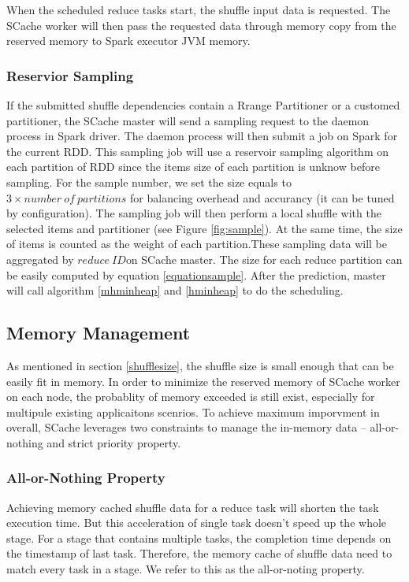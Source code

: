 When the scheduled reduce tasks start, the shuffle input data is requested. The SCache worker will then pass the requested data through memory copy from the reserved memory to Spark executor JVM memory. 

\subsubsection{Reservior Sampling}\label{sampling}
If the submitted shuffle dependencies contain a Rrange Partitioner or a customed partitioner, the SCache master will send a sampling request to the daemon process in Spark driver. The daemon process will then submit a job on Spark for the current RDD. This sampling job will use a reservoir sampling algorithm\cite{reservoir} on each partition of RDD since the items size of each partition is unknow before sampling. For the sample number, we set the size equals to $3 \times number\ of\ partitions$ for balancing overhead and accurancy (it can be tuned by configuration). The sampling job will then perform a local shuffle with the selected items and partitioner (see Figure \ref{fig:sample}). At the same time, the size of items is counted as the weight of each partition.These sampling data will be aggregated by $reduce\ ID$on SCache master. The size for each reduce partition can be easily computed by equation \ref{equationsample}. After the prediction, master will call algorithm \ref{mhminheap} and \ref{hminheap} to do the scheduling. 

\subsection{Memory Management}
As mentioned in section \ref{shufflesize}, the shuffle size is small enough that can be easily fit in memory. In order to minimize the reserved memory of SCache worker on each node, the probablity of memory exceeded is still exist, especially for multipule existing applicaitons scenrios. To achieve maximum imporvment in overall, SCache leverages two constraints to manage the in-memory data -- all-or-nothing and  strict priority property.
\subsubsection{All-or-Nothing Property}
Achieving memory cached shuffle data for a reduce task will shorten the task execution time. But this acceleration of single task doesn't speed up the whole stage. For a stage that contains multiple tasks, the completion time depends on the timestamp of last task. Therefore, the memory cache of shuffle data need to match every task in a stage. We refer to this as the all-or-noting property. 
